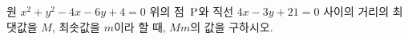 원 $x^2+y^2-4x-6y+4=0$ 위의 점~$\mathrm{P}$와 직선 $4x-3y+21=0$ 사이의 거리의 최댓값을 $M$, 최솟값을 $m$이라 할 때, $Mm$의 값을 구하시오.
